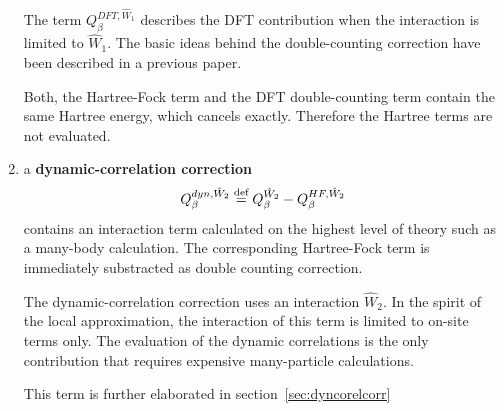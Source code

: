 \documentclass[11pt,a4paper]{report}
\begin{document}
\begin{enumerate}
  The term $Q^{DFT,\hat{W}_1}_\beta$ describes the DFT contribution
  when the interaction is limited to $\hat{W}_1$. The basic ideas
  behind the double-counting correction have been described in a
  previous paper\cite{bloechl11_prb84_205101}.

  Both, the Hartree-Fock term and the DFT double-counting term contain
  the same Hartree energy, which cancels exactly. Therefore the
  Hartree terms are not evaluated.
%
\item a \textbf{dynamic-correlation
  correction}
  \begin{eqnarray}
  Q^{dyn,\hat{W}_2}_\beta\stackrel{\text{def}}{=} Q^{\hat{W}_2}_\beta-Q^{HF,\hat{W}_2}_\beta
  \end{eqnarray}
  contains an interaction term calculated on the highest level of
  theory such as a many-body calculation. The corresponding
  Hartree-Fock term is immediately substracted as double counting
  correction.

  The dynamic-correlation correction uses an interaction
  $\hat{W}_2$. In the spirit of the local approximation, the
  interaction of this term is limited to on-site terms only. The
  evaluation of the dynamic correlations is the only contribution that
  requires expensive many-particle calculations.

  This term is further elaborated in section~\ref{sec:dyncorelcorr}
\end{enumerate}




\end{document}
